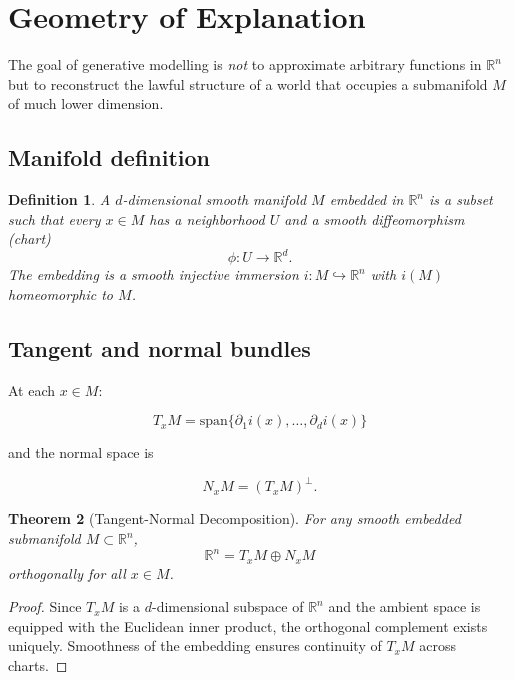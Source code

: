 \documentclass[11pt,a4paper,twocolumn]{article}
\newtheorem{theorem}{Theorem}[section]
\newtheorem{definition}[theorem]{Definition}
\begin{document}

\section{Geometry of Explanation}

The goal of generative modelling is \emph{not} to approximate arbitrary
functions in $\mathbb{R}^n$ but to reconstruct the lawful structure of a
world that occupies a submanifold $M$ of much lower dimension.

\subsection{Manifold definition}

\begin{definition}
A $d$-dimensional smooth manifold $M$ embedded in $\mathbb{R}^n$ is a
subset such that every $x \in M$ has a neighborhood $U$ and a smooth
diffeomorphism (chart)
\[
\phi: U \to \mathbb{R}^d.
\]
The embedding is a smooth injective immersion $i: M \hookrightarrow
\mathbb{R}^n$ with $i(M)$ homeomorphic to $M$.
\end{definition}

\subsection{Tangent and normal bundles}

At each $x \in M$:

\[
T_x M = \mathrm{span}\big\{\partial_1 i(x), \dots, \partial_d i(x)\big\}
\]

and the normal space is

\[
N_x M = (T_x M)^\perp.
\]

\begin{theorem}[Tangent-Normal Decomposition]
For any smooth embedded submanifold $M \subset \mathbb{R}^n$,
\[
\mathbb{R}^n = T_x M \oplus N_x M
\]
orthogonally for all $x \in M$.
\end{theorem}

\begin{proof}
Since $T_x M$ is a $d$-dimensional subspace of $\mathbb{R}^n$ and the
ambient space is equipped with the Euclidean inner product, the
orthogonal complement exists uniquely. Smoothness of the embedding
ensures continuity of $T_x M$ across charts.
\end{proof}
\end{document}
